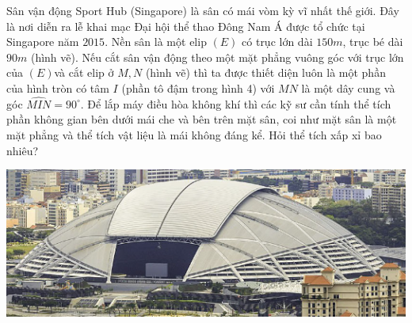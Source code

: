 \begin{ex}%
Sân vận động Sport Hub (Singapore) là sân có mái vòm kỳ vĩ nhất thế giới. Đây là nơi diễn ra lễ khai mạc Đại hội thể thao Đông Nam Á được tổ chức tại Singapore năm $2015$. Nền sân là một elip $\left( E \right)$ có trục lớn dài $150m$, trục bé dài $90m$ (hình vẽ). Nếu cắt sân vận động theo một mặt phẳng vuông góc với trục lớn của $\left( E \right)$và cắt elip ở $M,N$ (hình vẽ) thì ta được thiết diện luôn là một phần của hình tròn có tâm $I$ (phần tô đậm trong hình 4) với $MN$ là một dây cung và góc $\widehat{MIN}=90^{\circ}.$ Để lắp máy điều hòa không khí thì các kỹ sư cần tính thể tích phần không gian bên dưới mái che và bên trên mặt sân, coi như mặt sân là một mặt phẳng và thể tích vật liệu là mái không đáng kể. Hỏi thể tích xấp xỉ bao nhiêu?
  \begin{center}
  {\includegraphics[scale=0.8]{images/Cau3_C4B3CD3.png}\\
}
\end{center}
\end{ex}
